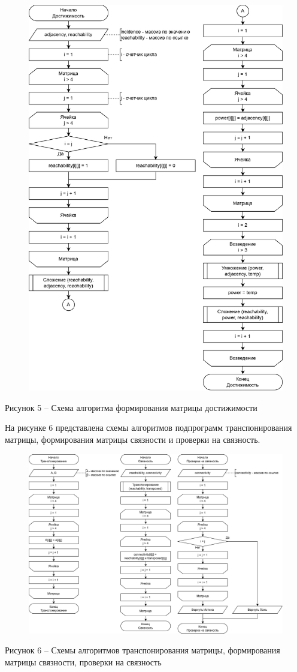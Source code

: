 \documentclass[a4paper,14pt]{extarticle}
\begin{document}
  \begin{figure}[h]
    \centering
    \includegraphics[width=0.7\linewidth]{images/s-4.png}
  \end{figure}
  \begin{center}
    Рисунок 5 – Схема алгоритма формирования матрицы достижимости
  \end{center}

  \pagebreak
  На рисунке 6 представлена схемы алгоритмов подпрограмм транспонирования матрицы, формирования матрицы связности и проверки на связность.

  \begin{figure}[h]
    \centering
    \includegraphics[width=1\linewidth]{images/s-5.png}
  \end{figure}
  \begin{center}
    Рисунок 6 – Схемы алгоритмов транспонирования матрицы, формирования матрицы связности, проверки на связность
  \end{center}
\end{document}
